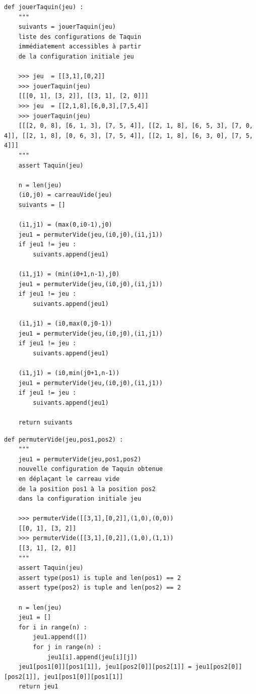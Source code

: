 \documentclass[11pt,a4paper]{article}
\begin{document}
\begin{lstlisting}
def jouerTaquin(jeu) :
    """
    suivants = jouerTaquin(jeu)
    liste des configurations de Taquin
    immédiatement accessibles à partir
    de la configuration initiale jeu
    
    >>> jeu  = [[3,1],[0,2]]
    >>> jouerTaquin(jeu)
    [[[0, 1], [3, 2]], [[3, 1], [2, 0]]]
    >>> jeu  = [[2,1,8],[6,0,3],[7,5,4]]
    >>> jouerTaquin(jeu)
    [[[2, 0, 8], [6, 1, 3], [7, 5, 4]], [[2, 1, 8], [6, 5, 3], [7, 0, 4]], [[2, 1, 8], [0, 6, 3], [7, 5, 4]], [[2, 1, 8], [6, 3, 0], [7, 5, 4]]]
    """
    assert Taquin(jeu)
    
    n = len(jeu)
    (i0,j0) = carreauVide(jeu)
    suivants = []

    (i1,j1) = (max(0,i0-1),j0)
    jeu1 = permuterVide(jeu,(i0,j0),(i1,j1))
    if jeu1 != jeu :
        suivants.append(jeu1)

    (i1,j1) = (min(i0+1,n-1),j0)
    jeu1 = permuterVide(jeu,(i0,j0),(i1,j1))
    if jeu1 != jeu :
        suivants.append(jeu1)

    (i1,j1) = (i0,max(0,j0-1))
    jeu1 = permuterVide(jeu,(i0,j0),(i1,j1))
    if jeu1 != jeu :
        suivants.append(jeu1)

    (i1,j1) = (i0,min(j0+1,n-1))
    jeu1 = permuterVide(jeu,(i0,j0),(i1,j1))
    if jeu1 != jeu :
        suivants.append(jeu1)

    return suivants
\end{lstlisting}

\begin{lstlisting}
def permuterVide(jeu,pos1,pos2) :
    """
    jeu1 = permuterVide(jeu,pos1,pos2)
    nouvelle configuration de Taquin obtenue
    en déplaçant le carreau vide
    de la position pos1 à la position pos2
    dans la configuration initiale jeu
    
    >>> permuterVide([[3,1],[0,2]],(1,0),(0,0))
    [[0, 1], [3, 2]]
    >>> permuterVide([[3,1],[0,2]],(1,0),(1,1))
    [[3, 1], [2, 0]]
    """
    assert Taquin(jeu)
    assert type(pos1) is tuple and len(pos1) == 2
    assert type(pos2) is tuple and len(pos2) == 2

    n = len(jeu)
    jeu1 = []
    for i in range(n) :
        jeu1.append([])
        for j in range(n) :
            jeu1[i].append(jeu[i][j])            
    jeu1[pos1[0]][pos1[1]], jeu1[pos2[0]][pos2[1]] = jeu1[pos2[0]][pos2[1]], jeu1[pos1[0]][pos1[1]]
    return jeu1
\end{lstlisting}


\end{document}
